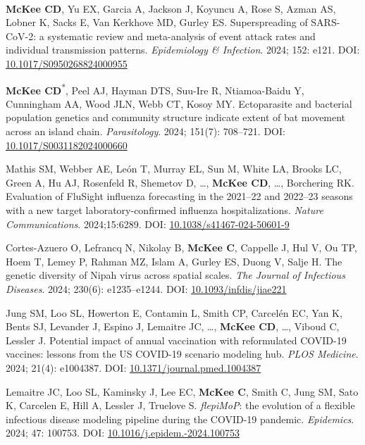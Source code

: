 \documentclass{cv}
\begin{document}
\begin{pubenum}
\item \textbf{McKee CD}, Yu EX, Garcia A\textsuperscript{\ddag}, Jackson J\textsuperscript{\ddag}, Koyuncu A, Rose S, Azman AS, Lobner K, Sacks E, Van Kerkhove MD, Gurley ES. Superspreading of SARS-CoV-2: a systematic review and meta-analysis of event attack rates and individual transmission patterns. \textit{Epidemiology \& Infection}. 2024; 152: e121. DOI: \href{https://doi.org/10.1017/S0950268824000955}{10.1017/S0950268824000955}

\item \textbf{McKee CD}\textsuperscript{*}, Peel AJ, Hayman DTS, Suu-Ire R, Ntiamoa-Baidu Y, Cunningham AA, Wood JLN, Webb CT, Kosoy MY. Ectoparasite and bacterial population genetics and community structure indicate extent of bat movement across an island chain. \textit{Parasitology}. 2024; 151(7): 708--721. DOI: \href{https://doi.org/10.1017/S0031182024000660}{10.1017/S0031182024000660}

\item Mathis SM, Webber AE, León T, Murray EL, Sun M, White LA, Brooks LC, Green A, Hu AJ, Rosenfeld R, Shemetov D, …, \textbf{McKee CD}, …, Borchering RK. Evaluation of FluSight influenza forecasting in the 2021--22 and 2022--23 seasons with a new target laboratory-confirmed influenza hospitalizations. \textit{Nature Communications}. 2024;15:6289. DOI: \href{https://doi.org/10.1038/s41467-024-50601-9}{10.1038/s41467-024-50601-9}

\item Cortes-Azuero O, Lefrancq N, Nikolay B, \textbf{McKee C}, Cappelle J, Hul V, Ou TP, Hoem T, Lemey P, Rahman MZ, Islam A, Gurley ES, Duong V, Salje H. The genetic diversity of Nipah virus across spatial scales. \textit{The Journal of Infectious Diseases}. 2024; 230(6): e1235--e1244. DOI: \href{https://doi.org/10.1093/infdis/jiae221}{10.1093/infdis/jiae221}

\item Jung SM, Loo SL, Howerton E, Contamin L, Smith CP, Carcelén EC, Yan K, Bents SJ, Levander J, Espino J, Lemaitre JC, …, \textbf{McKee CD}, …, Viboud C, Lessler J. Potential impact of annual vaccination with reformulated COVID-19 vaccines: lessons from the US COVID-19 scenario modeling hub. \textit{PLOS Medicine}. 2024; 21(4): e1004387. DOI: \href{https://doi.org/10.1371/journal.pmed.1004387}{10.1371/journal.pmed.1004387}

\item Lemaitre JC, Loo SL, Kaminsky J, Lee EC, \textbf{McKee C}, Smith C, Jung SM, Sato K, Carcelen E, Hill A, Lessler J, Truelove S. \textit{flepiMoP}: the evolution of a flexible infectious disease modeling pipeline during the COVID-19 pandemic. \textit{Epidemics}. 2024; 47: 100753. DOI: \href{https://doi.org/10.1016/j.epidem.2024.100753}{10.1016/j.epidem.-2024.100753}


\end{pubenum}
\end{document}
